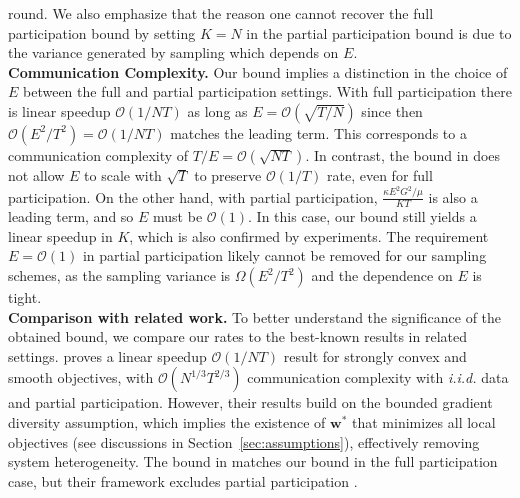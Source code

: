 round. We also emphasize that the reason one cannot recover the full participation bound by setting $K=N$ in the partial participation bound is due to the variance generated by sampling which depends on $E$.  \\
\textbf{Communication Complexity.} Our bound implies a distinction
in the choice of $E$ between the full and partial participation settings.
With full participation there is linear speedup $\mathcal{O}(1/NT)$
as long as $E=\mathcal{O}(\sqrt{T/N})$ since then $\mathcal{O}(E^{2}/T^{2})=\mathcal{O}(1/NT)$
matches the leading term. This corresponds to a communication complexity
of $T/E=\mathcal{O}(\sqrt{NT})$. In contrast, the bound in \cite{li2019convergence}
does not allow $E$ to scale with $\sqrt{T}$ to preserve $\mathcal{O}(1/T)$
rate, even for full participation. On the other hand, with partial
participation, $\frac{\kappa E^{2}G^{2}/\mu}{KT}$ is also a leading
term, and so $E$ must be $\mathcal{O}(1)$. In this case, our bound
still yields a linear speedup in $K$, which is also confirmed by
experiments. The requirement $E=\mathcal{O}(1)$ in partial participation
likely cannot be removed for our sampling schemes, as the sampling
variance is $\Omega(E^{2}/T^{2})$ and the dependence on $E$ is tight.  \\
\textbf{Comparison with related work.} To better understand the significance of the obtained bound, we compare our rates to the best-known results in related settings. \cite{haddadpour2019convergence} proves a linear speedup $\mathcal{O}(1/NT)$ result for strongly convex and smooth objectives, with $\mathcal{O}(N^{1/3}T^{2/3})$ communication complexity with \emph{i.i.d.} data and partial participation. However, their results build on the bounded gradient diversity assumption, which implies the existence of $\mathbf{w}^*$ that minimizes all local objectives (see discussions in Section~\ref{sec:assumptions}), effectively removing system heterogeneity. The bound in \cite{koloskova2020unified} matches our bound in the full participation case, but their framework excludes partial participation \cite[Proposition 1]{koloskova2020unified}.

\begin{comment}
	In this overparameterized setting, we prove a geometric convergence rate (see Section~\ref{sec:overparameterized}), 
	thus improving on the rate in \cite{haddadpour2019convergence} with
	better communication complexity. 
\end{comment}


